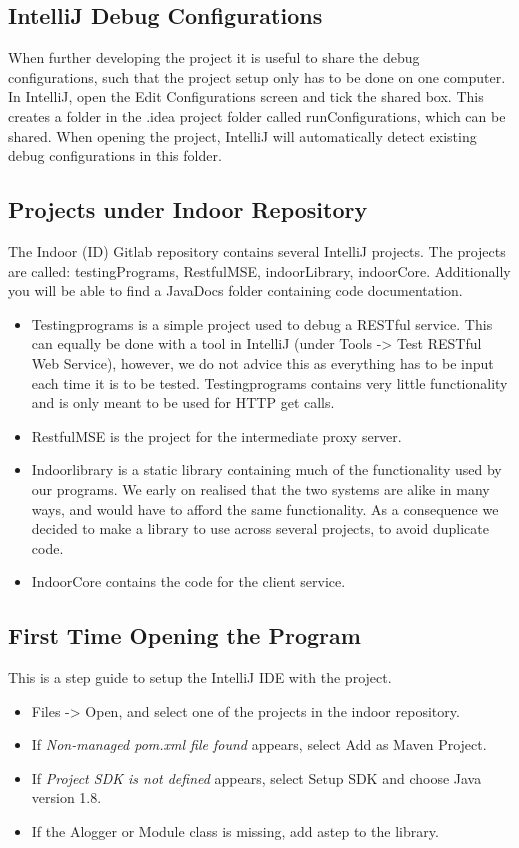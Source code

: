 \subsection*{IntelliJ Debug Configurations}
When further developing the project it is useful to share the debug configurations, such that the project setup only has to be done on one computer. In IntelliJ, open the Edit Configurations screen and tick the shared box. This creates a folder in the .idea project folder called runConfigurations, which can be shared. When opening the project, IntelliJ will automatically detect existing debug configurations in this folder.

\subsection*{Projects under Indoor Repository}
The Indoor (ID) Gitlab repository contains several IntelliJ projects. The projects are called: testingPrograms, RestfulMSE, indoorLibrary, indoorCore. Additionally you will be able to find a JavaDocs folder containing code documentation.

\begin{itemize}
\item Testingprograms is a simple project used to debug a RESTful service. This can equally be done with a tool in IntelliJ (under Tools -> Test RESTful Web Service), however, we do not advice this as everything has to be input each time it is to be tested. Testingprograms contains very little functionality and is only meant to be used for HTTP get calls.
\item RestfulMSE is the project for the intermediate proxy server. 
\item Indoorlibrary is a static library containing much of the functionality used by our programs. We early on realised that the two systems are alike in many ways, and would have to afford the same functionality. As a consequence we decided to make a library to use across several projects, to avoid duplicate code. 
\item IndoorCore contains the code for the client service. 
\end{itemize} 

\subsection*{First Time Opening the Program}
This is a step guide to setup the IntelliJ IDE with the project.
\begin{itemize}
\item Files -> Open, and select one of the projects in the indoor repository.
\item If \emph{Non-managed pom.xml file found} appears, select Add as Maven Project.
\item If \emph{Project SDK is not defined} appears, select Setup SDK and choose Java version 1.8.
\item If the Alogger or Module class is missing, add astep to the library.
\end{itemize}
